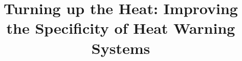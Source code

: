 \documentclass[twocol]{ametsoc}
\title{Turning up the Heat: Improving the Specificity of Heat Warning Systems}
\affiliation{}
\begin{document}
\maketitle{}

%






\end{document}
